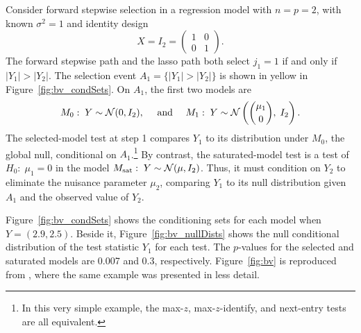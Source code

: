 \documentclass{article}
\begin{document}
\begin{example}\label{ex:bivariate}
  Consider forward stepwise selection in a regression model with $n=p=2$, with known $\sigma^2=1$ and identity design 
\[
X = I_2=\begin{pmatrix} 1 & 0 \\ 0 & 1\end{pmatrix}.
\] 
The forward stepwise path and the lasso path both select $j_1=1$ if and only if $|Y_1|>|Y_2|$. The selection event $A_1=\{|Y_1| > |Y_2|\}$ is shown in yellow in Figure~\ref{fig:bv_condSets}. On $A_1$, the first two models are
\[
M_0:\; Y\sim \mathcal{N}(0,I_2), \quad \text{ and } \quad
M_1:\; Y \sim \mathcal{N}\left(\binom{\mu_1}{0}, \; I_2\right).
\]
The selected-model test at step 1 compares $Y_1$ to its distribution under $M_0$, the global null, conditional on $A_1$.\footnote{In this very simple example, the max-$z$, max-$z$-identify, and next-entry tests are all equivalent.} By contrast, the saturated-model test is a test of $H_0:\; \mu_1=0$ in the model $M_{\text{sat}}:\; Y \sim \mathcal{N}(\mu, I_2)$. Thus, it must condition on $Y_2$ to eliminate the nuisance parameter $\mu_2$, comparing $Y_1$ to its null distribution given $A_1$ and the observed value of $Y_2$.

Figure~\ref{fig:bv_condSets} shows the conditioning sets for each model when $Y=(2.9, 2.5)$. Beside it, Figure~\ref{fig:bv_nullDists} shows the null conditional distribution of the test statistic $Y_1$ for each test. The $p$-values for the selected and saturated models are 0.007 and 0.3, respectively. Figure~\ref{fig:bv} is reproduced from \citet{fithian2014optimal}, where the same example was presented in less detail.
\end{example}
\end{document}
